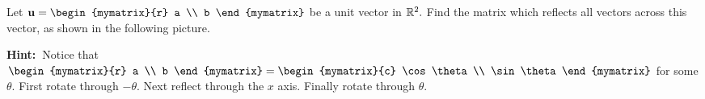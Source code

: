 \begin{enumialphparenastyle}
\begin{ex} Let $\vect{u}=\begin{mymatrix}{r}
a \\
b
\end{mymatrix} $ be a unit vector in $\mathbb{R}^{2}.$ Find the matrix
 which reflects all vectors across
this vector, as shown in the following picture. 

\begin{center}
\end{center}


\textbf{Hint:\ }Notice that $\begin{mymatrix}{r}
a \\
b
\end{mymatrix} =\begin{mymatrix}{c}
\cos \theta  \\
\sin \theta 
\end{mymatrix} $ for some $\theta .$ First rotate through $-\theta .$ Next reflect through the $x$ axis. Finally rotate
through $\theta $. 
\end{ex}
\end{enumialphparenastyle}
